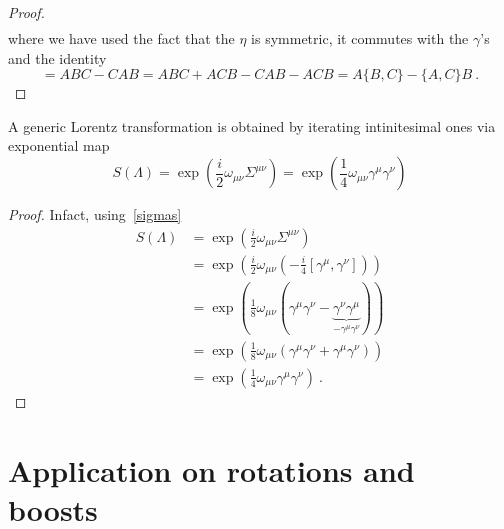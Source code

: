 \begin{proof}
\begin{equation*}
\begin{aligned}
        \end{aligned}
        \end{equation*}
        where we have used the fact that the $\eta$ is symmetric, it commutes with the $\gamma$'s and the identity
        \begin{equation*}
            [AB,C] = ABC - CAB = ABC + ACB - CAB - ACB = A \{B, C\} - \{A, C\} B ~.
        \end{equation*}
    \end{proof}

    A generic Lorentz transformation is obtained by iterating intinitesimal ones via exponential map
    \begin{equation}\label{lorspin}
        S(\Lambda) = \exp(\frac{i}{2} \omega_{\mu\nu} \Sigma^{\mu\nu}) = \exp(\frac{1}{4} \omega_{\mu\nu} \gamma^\mu \gamma^\nu)
    \end{equation}
    \begin{proof}
        Infact, using~\eqref{sigmas}
        \begin{equation*}
        \begin{aligned}
            S(\Lambda) & = \exp(\frac{i}{2} \omega_{\mu\nu} \Sigma^{\mu\nu}) \\ & =  \exp(\frac{i}{2} \omega_{\mu\nu} (-\frac{i}{4} [\gamma^\mu,\gamma^\nu])) \\ & = \exp(\frac{1}{8} \omega_{\mu\nu} (\gamma^\mu \gamma^\nu - \underbrace{\gamma^\nu \gamma^\mu}_{-\gamma^\mu \gamma^\nu})) \\ & = \exp(\frac{1}{8} \omega_{\mu\nu} (\gamma^\mu \gamma^\nu + \gamma^\mu \gamma^\nu )) \\ & = \exp(\frac{1}{4} \omega_{\mu\nu} \gamma^\mu \gamma^\nu) ~.
        \end{aligned}
        \end{equation*}
    \end{proof}

\section{Application on rotations and boosts}

